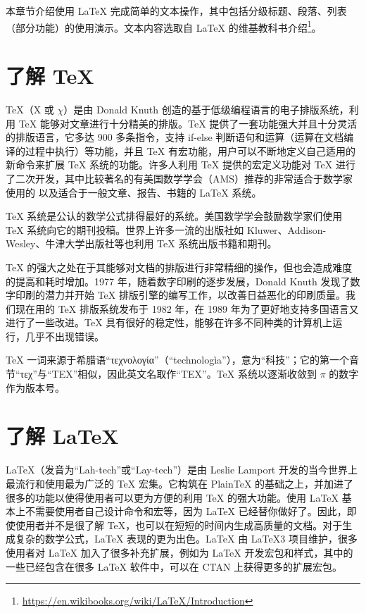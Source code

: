 \documentclass[report,oneside,UTF8,zihao=-4]{config}
\begin{document}
本章节介绍使用 \LaTeX{} 完成简单的文本操作，其中包括分级标题、段落、列表（部分功能）的使用演示。文本内容选取自 \LaTeX{} 的维基教科书介绍\footnote{\url{https://en.wikibooks.org/wiki/LaTeX/Introduction}}。

\section{了解 \TeX{}}

\TeX{}（X 或 $\chi$）是由 Donald Knuth 创造的基于低级编程语言的电子排版系统，利用 \TeX{} 能够对文章进行十分精美的排版。\TeX{} 提供了一套功能强大并且十分灵活的排版语言，它多达 900 多条指令，支持 if-else 判断语句和运算（运算在文档编译的过程中执行）等功能，并且 \TeX{} 有宏功能，用户可以不断地定义自己适用的新命令来扩展 \TeX{} 系统的功能。许多人利用 \TeX{} 提供的宏定义功能对 \TeX{} 进行了二次开发，其中比较著名的有美国数学学会（AMS）推荐的非常适合于数学家使用的  以及适合于一般文章、报告、书籍的 \LaTeX{} 系统。

\TeX{} 系统是公认的数学公式排得最好的系统。美国数学学会鼓励数学家们使用 \TeX{} 系统向它的期刊投稿。世界上许多一流的出版社如 Kluwer、Addison-Wesley、牛津大学出版社等也利用 \TeX{} 系统出版书籍和期刊。

\TeX{} 的强大之处在于其能够对文档的排版进行非常精细的操作，但也会造成难度的提高和耗时增加。1977 年，随着数字印刷的逐步发展，Donald Knuth 发现了数字印刷的潜力并开始 \TeX{} 排版引擎的编写工作，以改善日益恶化的印刷质量。我们现在用的 \TeX{} 排版系统发布于 1982 年，在 1989 年为了更好地支持多国语言又进行了一些改进。\TeX{} 具有很好的稳定性，能够在许多不同种类的计算机上运行，几乎不出现错误。

\TeX{} 一词来源于希腊语“τεχνολογία”（“technologìa”），意为“科技”；它的第一个音节“τεχ”与“TEX”相似，因此英文名取作“TEX”。\TeX{} 系统以逐渐收敛到 $\pi$ 的数字作为版本号。

\section{了解 \LaTeX{}}

\LaTeX{}（发音为“Lah-tech”或“Lay-tech”）是由 Leslie Lamport 开发的当今世界上最流行和使用最为广泛的 \TeX{} 宏集。它构筑在 PlainTeX 的基础之上，并加进了很多的功能以使得使用者可以更为方便的利用 \TeX{} 的强大功能。使用 \LaTeX{} 基本上不需要使用者自己设计命令和宏等，因为 \LaTeX{} 已经替你做好了。因此，即使使用者并不是很了解 \TeX{}，也可以在短短的时间内生成高质量的文档。对于生成复杂的数学公式，\LaTeX{} 表现的更为出色。\LaTeX{} 由 \LaTeX{3} 项目维护，很多使用者对 \LaTeX{} 加入了很多补充扩展，例如为 \LaTeX{} 开发宏包和样式，其中的一些已经包含在很多 \LaTeX{} 软件中，可以在 CTAN 上获得更多的扩展宏包。
\end{document}

